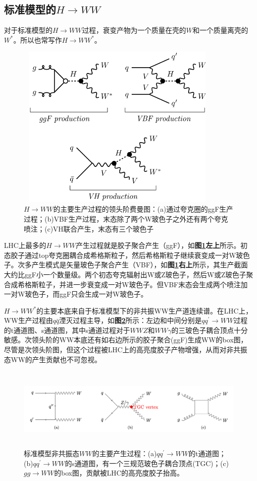 \subsection{标准模型的$H\to WW$}
对于标准模型的$H\to WW$过程，衰变产物为一个质量在壳的$W$和一个质量离壳的$W^*$。所以也常写作$H\to WW^*$。
\begin{figure}[H]
 \centering
 \includegraphics[height=8cm, width=10cm]{pictures/HWW_production.png}
  \caption{$H\to WW$的主要生产过程的领头阶费曼图：(a)通过夸克圈的ggF生产过程；(b)VBF生产过程，末态除了两个W玻色子之外还有两个夸克喷注；(c)VH联合产生，末态有三个玻色子}
 \label{fig:2.4}
\end{figure}
LHC上最多的$H\to WW$产生过程就是胶子聚合产生（ggF），如\textbf{图\ref{fig:2.4}左上}所示。初态胶子通过top夸克圈耦合成希格斯粒子，然后希格斯粒子继续衰变成一对W玻色子。次多产生模式是矢量玻色子聚合产生（VBF），如\textbf{图\ref{fig:2.4}右上}所示，其生产截面大约比ggF小一个数量级。两个初态夸克辐射出W或Z玻色子，然后W或Z玻色子聚合成希格斯粒子，并进一步衰变成一对W玻色子。但VBF末态会生成两个喷注加一对W玻色子，而ggF只会生成一对W玻色子。

$H\to WW^*$的主要本底来自于标准模型下的非共振WW生产道连续谱。在LHC上，WW生产过程由$q\bar{q}$湮灭过程主导\cite{john-alison}，如\textbf{图\ref{fig:2.5}}所示：左边和中间分别是$qq^\prime\to WW$过程的t通道图、s通道图，其中s通道过程对于$WWZ$和$WW\gamma$的三玻色子耦合顶点十分敏感。次领头阶的WW本底还有如右边所示的胶子聚合(ggF)生成WW的box图，尽管是次领头阶图，但这个过程被LHC上的高亮度胶子产物增强，从而对非共振态WW的产生贡献也不可忽视。
\begin{figure}[H]
 \centering
 \includegraphics[height=4cm, width=16cm]{pictures/WW_bkg.png}
  \caption{标准模型非共振态$WW$的主要产生过程\cite{john-alison}：(a)$qq^\prime\to WW$的t通道图；(b)$qq^\prime\to WW$的s通道图，有一个三规范玻色子耦合顶点(TGC)；(c)$gg\to WW$的box图，贡献被LHC的高亮度胶子抬高。}
 \label{fig:2.5}
\end{figure}

